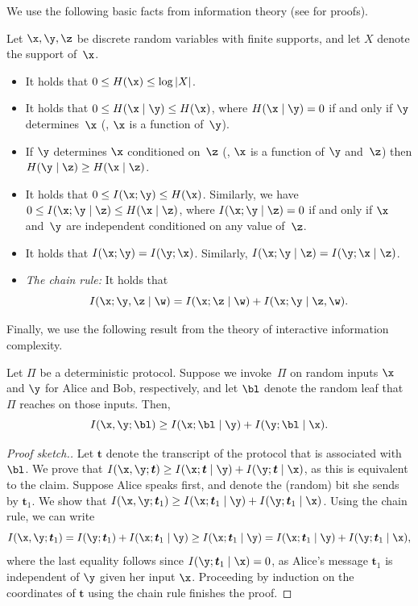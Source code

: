\documentclass{toc}
\begin{document}
We use the following basic facts from information theory (see \cite{CT91}
for proofs). 
\begin{fact}
\label{fact:information-properties}Let $\x,\y,\z$ be discrete random
variables with finite supports, and let $X$ denote the support of~$\x$. 
\begin{itemize}
\item It holds that $0\le H(\x)\le\log\left|X\right|$. 
\item It holds that $0\le H(\x\mid\y)\le H(\x)$, where $H(\x\mid\y)=0$
if and only if $\y$ determines~$\x$ (\ie, $\x$ is a function
of~$\y$). 
\item If $\y$ determines $\x$ conditioned on~$\z$ (\ie, $\x$ is a
function of $\y$ and~$\z$) then $H(\y\mid\z)\ge H(\x\mid\z)$. 
\item It holds that $0\le I(\x;\y)\le H(\x)$. Similarly, we have
$0\le I(\x;\y\mid\z)\le H(\x\mid\z)$, where $I(\x;\y\mid\z)=0$ if
and only if $\x$ and~$\y$ are independent conditioned on any value
of~$\z$. 
\item It holds that $I(\x;\y)=I(\y;\x)$. Similarly, $I(\x;\y\mid\z)=I(\y;\x\mid\z)$. 
\item \emph{The chain rule:} It holds that 
\[
I(\x;\y,\z\mid\w)=I(\x;\z\mid\w)+I(\x;\y\mid\z,\w).
\]
\end{itemize}
\end{fact}

Finally, we use the following result from the theory of interactive
information complexity. 
\begin{claim}
\label{claim:internal-vs-external-information}Let $\Pi$ be a deterministic
protocol. Suppose we invoke~$\Pi$ on random inputs $\x$ and $\y$
for Alice and Bob, respectively, and let $\bl$ denote the random
leaf that $\Pi$ reaches on those inputs. Then, 
\[
I(\x,\y;\bl)\ge I(\x;\bl\mid\y)+I(\y;\bl\mid\x).
\]
\end{claim}

\begin{proof}[Proof sketch.]
Let $\boldsymbol{t}$ denote the transcript of the protocol that
is associated with~$\bl$. We prove that $I(\x,\y;\boldsymbol{t})\ge I(\x;\boldsymbol{t}\mid\y)+I(\y;\boldsymbol{t}\mid\x)$,
as this is equivalent to the claim. Suppose Alice speaks first, and
denote the (random) bit she sends by $\boldsymbol{t}_{1}$. We show
that $I(\x,\y;\boldsymbol{t}_{1})\ge I(\x;\boldsymbol{t}_{1}\mid\y)+I(\y;\boldsymbol{t}_{1}\mid\x)$.
Using the chain rule, we can write 
\[
I(\x,\y;\boldsymbol{t}_{1})=I(\y;\boldsymbol{t}_{1})+I(\x;\boldsymbol{t}_{1}\mid\y)\geq I(\x;\boldsymbol{t}_{1}\mid\y)=I(\x;\boldsymbol{t}_{1}\mid\y)+I(\y;\boldsymbol{t}_{1}\mid\x),
\]
where the last equality follows since $I(\y;\boldsymbol{t}_{1}\mid\x)=0$,
as Alice's message $\boldsymbol{t}_{1}$ is independent of $\y$ given
her input $\x$. Proceeding by induction on the coordinates of $\boldsymbol{t}$
using the chain rule finishes the proof. 
\end{proof}
\end{document}
